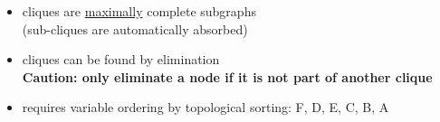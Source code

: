 \begin{frame} \frametitle{\subsecname
}
					\slidesonly{\vspace{5mm}}
				\begin{itemize}
					\item cliques are \underline{maximally} complete subgraphs\\
					(sub-cliques are automatically absorbed)
					\item cliques can be found by elimination \\
					
					\slidesonly{\vspace{10mm}}
					\textbf{Caution: only eliminate a node if it is not part of another clique}
					\slidesonly{\vspace{5mm}}
					\item requires variable ordering by topological sorting: 
						F, D, E, C, B, A
				\end{itemize}
	
	
	

\end{frame}
